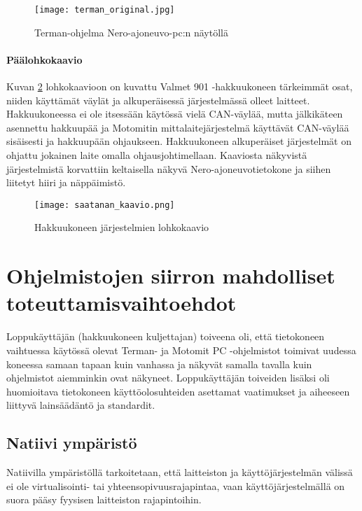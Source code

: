 \begin{figure}[H]
\centering
\texttt{[image: terman\_original.jpg]}
\caption{Terman-ohjelma Nero-ajoneuvo-pc:n näytöllä}
\label{kuva_terman}
\end{figure}

\newpage
\subsubsection{Päälohkokaavio}
Kuvan \ref{kuva_lohkokaavio} lohkokaavioon on kuvattu Valmet 901 -hakkuukoneen tärkeimmät osat, niiden käyttämät väylät ja alkuperäisessä järjestelmässä olleet laitteet. Hakkuukoneessa ei ole itsessään käytössä vielä CAN-väylää, mutta jälkikäteen asennettu hakkuupää ja Motomitin mittalaitejärjestelmä käyttävät CAN-väylää sisäisesti ja hakkuupään ohjaukseen. Hakkuukoneen alkuperäiset järjestelmät on ohjattu jokainen laite omalla ohjausjohtimellaan. Kaaviosta näkyvistä järjestelmistä korvattiin keltaisella näkyvä Nero-ajoneuvotietokone ja siihen liitetyt hiiri ja näppäimistö.

\begin{figure}[H]
\centering
\texttt{[image: saatanan\_kaavio.png]}
\caption{Hakkuukoneen järjestelmien lohkokaavio}
\label{kuva_lohkokaavio}
\end{figure}

\newpage
\chapter{Ohjelmistojen siirron mahdolliset toteuttamisvaihtoehdot}

Loppukäyttäjän (hakkuukoneen kuljettajan) toiveena oli, että tietokoneen vaihtuessa käytössä olevat Terman- ja Motomit PC -ohjelmistot toimivat uudessa koneessa samaan tapaan kuin vanhassa ja näkyvät samalla tavalla kuin ohjelmistot aiemminkin ovat näkyneet. Loppukäyttäjän toiveiden lisäksi oli huomioitava tietokoneen käyttöolosuhteiden asettamat vaatimukset ja aiheeseen liittyvä lainsäädäntö ja standardit.

\section{Natiivi ympäristö}
Natiivilla ympäristöllä tarkoitetaan, että laitteiston ja käyttöjärjestelmän välissä ei ole virtualisointi- tai yhteensopivuusrajapintaa, vaan käyttöjärjestelmällä on suora pääsy fyysisen laitteiston rajapintoihin.



